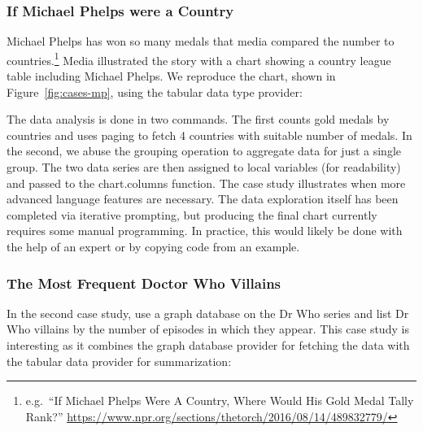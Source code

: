 \documentclass[manuscript,review,anonymous]{acmart}
\newcommand{\kvd}[1]{\textbf{#1}}
\newcommand{\ikvd}[1]{{\fontfamily{zi4}\selectfont\small #1}}
\begin{document}
\subsubsection*{If Michael Phelps were a Country}
Michael Phelps has won so many medals that media compared the number to
countries.\footnote{e.g.~``If Michael Phelps Were A Country, Where Would His Gold Medal Tally Rank?''
 \url{https://www.npr.org/sections/thetorch/2016/08/14/489832779/}}
Media illustrated the story with a chart showing a country league table including Michael Phelps.
We reproduce the chart, shown in Figure~\ref{fig:cases-mp}, using the tabular data type provider:


\noindent
The data analysis is done in two commands. The first counts gold medals by countries
and uses paging to fetch 4 countries with suitable number of medals. In the second, we abuse the
grouping operation to aggregate data for just a single group. The two data series are then assigned
to local variables (for readability) and passed to the \ikvd{chart.columns} function.
The case study illustrates when more advanced language features are necessary. The data exploration
itself has been completed via iterative prompting, but producing the final chart currently requires
some manual programming. In practice, this would likely be done with the help of an expert
or by copying code from an example.

\subsubsection*{The Most Frequent Doctor Who Villains}
In the second case study, use a graph database on the Dr Who series and list Dr Who villains
by the number of episodes in which they appear. This case study is interesting as it
combines the graph database provider for fetching the data with the tabular data provider for
summarization:
\end{document}
